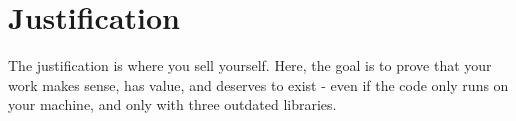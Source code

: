 \section{Justification}
\label{justificativa}

The justification is where you sell yourself. Here, the goal is to prove that your work makes sense, has value, and deserves to exist - even if the code only runs on your machine, and only with three outdated libraries.
